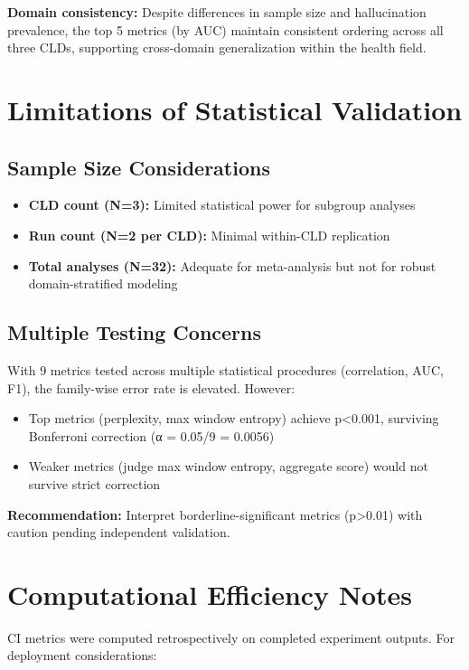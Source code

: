 \textbf{Domain consistency:} Despite differences in sample size and hallucination prevalence, the top 5 metrics (by AUC) maintain consistent ordering across all three CLDs, supporting cross-domain generalization within the health field.

\section{Limitations of Statistical Validation}

\subsection{Sample Size Considerations}

\begin{itemize}
    \item \textbf{CLD count (N=3):} Limited statistical power for subgroup analyses
    \item \textbf{Run count (N=2 per CLD):} Minimal within-CLD replication
    \item \textbf{Total analyses (N=32):} Adequate for meta-analysis but not for robust domain-stratified modeling
\end{itemize}

\subsection{Multiple Testing Concerns}

With 9 metrics tested across multiple statistical procedures (correlation, AUC, F1), the family-wise error rate is elevated. However:

\begin{itemize}
    \item Top metrics (perplexity, max window entropy) achieve p<0.001, surviving Bonferroni correction (α = 0.05/9 = 0.0056)
    \item Weaker metrics (judge max window entropy, aggregate score) would not survive strict correction
\end{itemize}

\textbf{Recommendation:} Interpret borderline-significant metrics (p>0.01) with caution pending independent validation.

\section{Computational Efficiency Notes}

CI metrics were computed retrospectively on completed experiment outputs. For deployment considerations:

